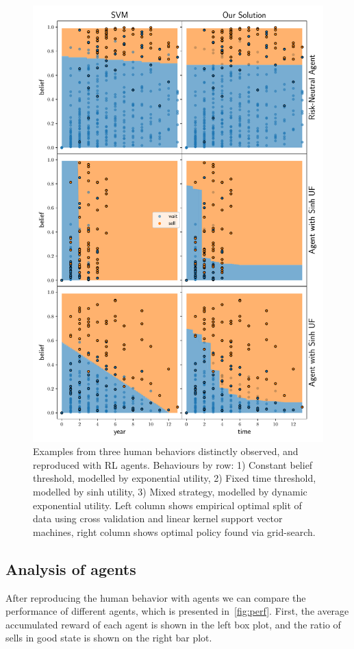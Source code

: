 \begin{figure}[h]
    \centering
    \includegraphics[width=0.99\linewidth]{img/fit}
    \caption{Examples from three human behaviors distinctly observed, and reproduced with RL agents. Behaviours by row: 1) Constant belief threshold, modelled by exponential utility, 2) Fixed time threshold, modelled by sinh utility, 3) Mixed strategy, modelled by dynamic exponential utility. Left column shows empirical optimal split of data using cross validation and linear kernel support vector machines, right column shows optimal policy found via grid-search.}
    \label{fig:svm_vs_value}
\end{figure}

\subsection{Analysis of agents}
After reproducing the human behavior with agents we can compare the performance of different agents, which is presented in~\autoref{fig:perf}.
First, the average accumulated reward of each agent is shown in the left box plot, and the ratio of sells in good state is shown on the right bar plot.

